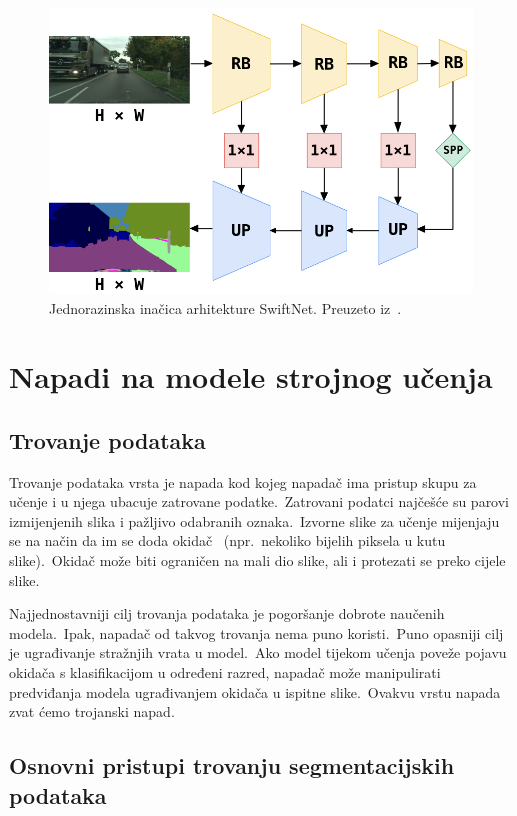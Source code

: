 \documentclass[times, utf8, seminar, numeric]{fer}
\begin{document}
\begin{figure}[h]
    \centering
    \includegraphics[scale=0.425]{./Slike/swiftnet.png}
    \caption{Jednorazinska inačica arhitekture SwiftNet. Preuzeto iz~\cite{orvsic2021efficient}.}
    \label{fig:swiftnet}
\end{figure}

\chapter{Napadi na modele strojnog učenja}

\section{Trovanje podataka}

Trovanje podataka vrsta je napada kod kojeg napadač ima pristup skupu za učenje i u njega ubacuje zatrovane podatke.\
Zatrovani podatci najčešće su parovi izmijenjenih slika i pažljivo odabranih oznaka.\ 
Izvorne slike za učenje mijenjaju se na način da im se doda okidač~\cite{chen2017targeted} (npr.\ nekoliko bijelih piksela u kutu slike).\ 
Okidač može biti ograničen na mali dio slike, ali i protezati se preko cijele slike.\
  
Najjednostavniji cilj trovanja podataka je pogoršanje dobrote naučenih modela.\ Ipak, napadač od takvog trovanja nema puno koristi.\
Puno opasniji cilj je ugrađivanje stražnjih vrata u model.\ 
Ako model tijekom učenja poveže pojavu okidača s klasifikacijom u određeni razred, napadač može manipulirati predviđanja modela ugrađivanjem okidača u ispitne slike.\
Ovakvu vrstu napada zvat ćemo trojanski napad.\

\section{Osnovni pristupi trovanju segmentacijskih podataka}
\end{document}
